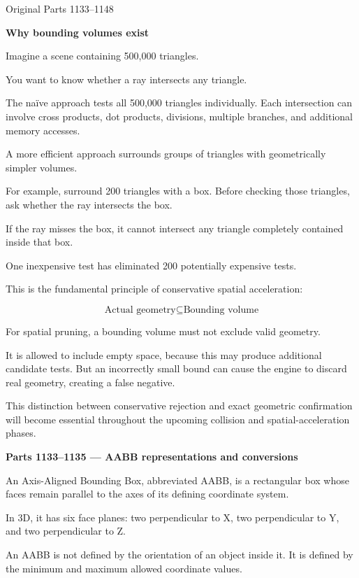 \hypertarget{03-visual-computing-i-ch021-axis-aligned-bounding-boxes}{}

Original Parts 1133--1148

\textbf{Why bounding volumes exist}

Imagine a scene containing 500,000 triangles.

You want to know whether a ray intersects any triangle.

The naïve approach tests all 500,000 triangles individually. Each intersection can involve cross products, dot products, divisions, multiple branches, and additional memory accesses.

A more efficient approach surrounds groups of triangles with geometrically simpler volumes.

For example, surround 200 triangles with a box. Before checking those triangles, ask whether the ray intersects the box.

If the ray misses the box, it cannot intersect any triangle completely contained inside that box.

One inexpensive test has eliminated 200 potentially expensive tests.

This is the fundamental principle of conservative spatial acceleration:

\[
\boxed{\text{Actual geometry}\subseteq\text{Bounding volume}}
\]

For spatial pruning, a bounding volume must not exclude valid geometry.

It is allowed to include empty space, because this may produce additional candidate tests. But an incorrectly small bound can cause the engine to discard real geometry, creating a false negative.

This distinction between conservative rejection and exact geometric confirmation will become essential throughout the upcoming collision and spatial-acceleration phases.

\textbf{Parts 1133--1135 --- AABB representations and conversions}

An Axis-Aligned Bounding Box, abbreviated AABB, is a rectangular box whose faces remain parallel to the axes of its defining coordinate system.

In 3D, it has six face planes: two perpendicular to X, two perpendicular to Y, and two perpendicular to Z.

An AABB is not defined by the orientation of an object inside it. It is defined by the minimum and maximum allowed coordinate values.

